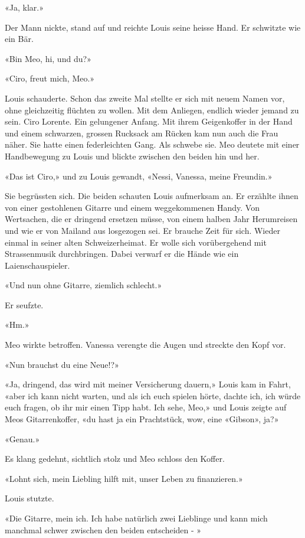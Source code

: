 «Ja, klar.»

Der Mann nickte, stand auf und reichte Louis seine heisse Hand. Er
schwitzte wie ein Bär.

«Bin Meo, hi, und du?»

«Ciro, freut mich, Meo.»

Louis schauderte. Schon das zweite Mal stellte er sich mit neuem Namen vor,
ohne gleichzeitig flüchten zu wollen. Mit dem Anliegen, endlich wieder
jemand zu sein. Ciro Lorente. Ein gelungener Anfang. Mit ihrem Geigenkoffer in der Hand und einem schwarzen, grossen Rucksack am Rücken kam nun auch die Frau näher. Sie hatte einen federleichten Gang. Als schwebe sie. Meo deutete mit einer Handbewegung zu Louis und blickte zwischen den beiden hin und her.

«Das ist Ciro,» und zu Louis gewandt, «Nessi, Vanessa, meine Freundin.»

Sie begrüssten sich. Die beiden schauten Louis aufmerksam an.
Er erzählte ihnen von einer gestohlenen Gitarre und einem weggekommenen
Handy. Von Wertsachen, die er dringend ersetzen müsse, von einem halben
Jahr Herumreisen und wie er von Mailand aus losgezogen sei. Er brauche
Zeit für sich. Wieder einmal in seiner alten Schweizerheimat. Er wolle
sich vorübergehend mit Strassenmusik durchbringen.
Dabei verwarf er die Hände wie ein Laienschauspieler.

«Und nun ohne Gitarre, ziemlich schlecht.»

Er seufzte.

«Hm.»

Meo wirkte betroffen. Vanessa verengte die Augen und streckte den
Kopf vor.

«Nun brauchst du eine Neue!?»

«Ja, dringend, das wird mit meiner Versicherung dauern,» Louis kam in Fahrt, 
«aber ich kann nicht warten, und als ich euch spielen hörte,
dachte ich, ich würde euch fragen, ob ihr mir einen Tipp habt. Ich sehe,
Meo,» und Louis zeigte auf Meos Gitarrenkoffer, «du hast ja ein
Prachtstück, wow, eine «Gibson», ja?»

«Genau.»

Es klang gedehnt, sichtlich stolz und Meo schloss den Koffer.

«Lohnt sich, mein Liebling hilft mit, unser Leben zu finanzieren.»

Louis stutzte.

«Die Gitarre, mein ich. Ich habe natürlich zwei Lieblinge und kann mich
manchmal schwer zwischen den beiden entscheiden - »

